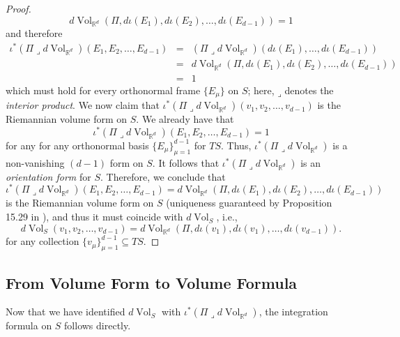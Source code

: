 \documentclass{article}
\newcommand{\R}{\mathbb{R}}
\newcommand{\iprod}{\mathbin{\lrcorner}}
\theoremstyle{theorem}
\newcommand{\Vol}{\operatorname{Vol}}
\begin{document}
\begin{proof}
\begin{equation*}
    d\Vol_{\R^d}(\Pi,d\iota(E_1),d\iota(E_2),\dots,d\iota(E_{d-1})) = 1
\end{equation*}
and therefore
\begin{eqnarray*}
     \iota^* (\Pi  \iprod d\Vol_{\R^d})(E_1,E_2,\dots, E_{d-1})&=& (\Pi  \iprod d\Vol_{\R^d})(d\iota(E_1),\dots, d\iota(E_{d-1})) \\
     &=& d\Vol_{\R^d}(\Pi, d\iota(E_1),d\iota(E_2),\dots, d\iota(E_{d-1})) \\
    &=& 1
\end{eqnarray*}
which must hold for every orthonormal frame $\{E_\mu\}$ on $S$; here, $\iprod$ denotes the \textit{interior product}. We now claim that $\iota^* (\Pi \iprod  d\Vol_{\R^d})(v_1,v_2,\dots, v_{d-1})$ is the Riemannian volume form on $S$. We already have that
\begin{equation*}
    \iota^* (\Pi  \iprod d\Vol_{\R^d})(E_1,E_2,\dots, E_{d-1}) = 1
\end{equation*}
for any for any orthonormal basis $\{ E_{\mu} \}_{\mu=1}^{d-1}$ for $T S$. Thus, $\iota^* (\Pi  \iprod d\Vol_{\R^d})$ is a non-vanishing $(d-1)$ form on $S$. It follows that $\iota^* (\Pi  \iprod d\Vol_{\R^d})$ is an \textit{orientation form} for $S$. Therefore, we conclude that 
\begin{equation*}
    \iota^* (\Pi  \iprod d\Vol_{\R^d})(E_1,E_2,\dots, E_{d-1}) = d\Vol_{\R^d}(\Pi, d\iota(E_1),d\iota(E_2),\dots, d\iota(E_{d-1}))
\end{equation*}
is the Riemannian volume form on $S$ (uniqueness guaranteed by Proposition 15.29 in \cite{lee2013smooth}), and thus it must coincide with  $d\Vol_S$, i.e.,
\begin{equation*}
    d\Vol_S(v_1,v_2,\dots, v_{d-1}) = d\Vol_{\R^d}(\Pi, d\iota(v_1),d\iota(v_1),\dots, d\iota(v_{d-1})).
\end{equation*}
for any collection $\{v_\mu\}_{\mu=1}^{d-1} \subseteq TS$. 
\end{proof}


\subsection{From Volume Form to Volume Formula}

Now that we have identified $d\Vol_S$ with $\iota^*(\Pi \iprod d\Vol_{\R^d})$, the integration formula on $S$ follows directly. 
\end{document}
